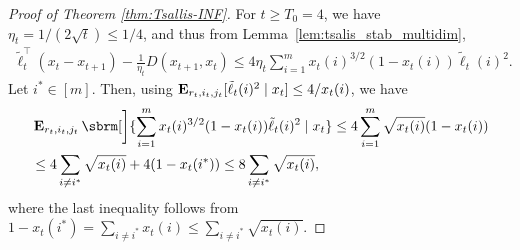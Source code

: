 \begin{proof}[Proof of Theorem \ref{thm:Tsallis-INF}]
For $t \geq T_0 = 4$, 
we have $\eta_t = 1/(2\sqrt{t}) \leq 1/4$,
and thus from Lemma~\ref{lem:tsalis_stab_multidim},
\begin{align}
    \tilde{\ell}_t^\top (x_t - x_{t+1})
    -
    \frac{1}{\eta_t} D(x_{t+1}, x_t)
    \leq
    4
    \eta_t
    \sum_{i=1}^m
    x_t(i)^{3/2} (1 - x_t(i))
    \tilde{\ell}_t(i)^2
    .
    \label{eq:ftrl_tsallis_stab2}
\end{align}
Let $i^* \in [m]$.
Then,
using $\operatorname*{\mathbf{E}}_{r_t,i_t,j_t}[ \tilde{\ell}_t(i)^2 \mid x_t] \leq 4 / x_t(i)$,
we have
\begin{align}
    &
    \E\nolimits_{r_t, i_t, j_t} \sbrm[\bigg]{
        \sum_{i=1}^m
        x_t(i)^{3/2} (1 - x_t(i))
        \tilde{\ell}_t(i)^2
        \mid
        x_t
    }
    \leq
    4
    \sum_{i=1}^m
    \sqrt{x_t(i)} (1 - x_t(i))
    \nonumber \\
    &\leq
    4
    \sum_{i \neq i^*}
    \sqrt{x_t(i)}
    +
    4
    (1 - x_t(i^*))
    \leq
    8
    \sum_{i \neq i^*}
    \sqrt{x_t(i)}
    ,
    \label{eq:ftrl_tsallis_stab_final}
\end{align}
where the last inequality follows from
$1 - x_t(i^*) = \sum_{i \neq i^*} x_t(i) \leq \sum_{i \neq i^*} \sqrt{x_t(i)}$.



\end{proof}
